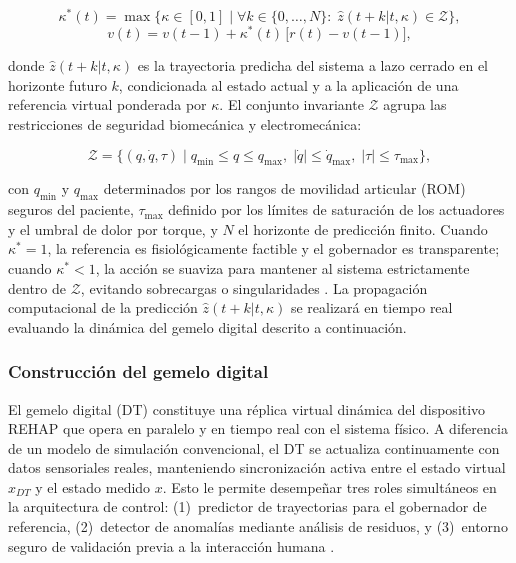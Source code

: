 \documentclass[a4paper,12pt]{article}
\begin{document}
\begin{equation}
    \kappa^{*}(t) = \max\bigl\{\kappa \in [0,1] \;\big|\; \forall k\in\{0,\ldots,N\}:\; \hat{z}(t+k|t, \kappa)\in\mathcal{Z}\bigr\},
    \label{eq:governor}
\end{equation}
\begin{equation}
    v(t) = v(t-1) + \kappa^{*}(t)\,\bigl[r(t) - v(t-1)\bigr],
    \label{eq:governor2}
\end{equation}

\noindent donde $\hat{z}(t+k|t, \kappa)$ es la trayectoria predicha del sistema a lazo cerrado en el horizonte futuro $k$, condicionada al estado actual y a la aplicación de una referencia virtual ponderada por $\kappa$. El conjunto invariante $\mathcal{Z}$ agrupa las restricciones de seguridad biomecánica y electromecánica:

\begin{equation}
    \mathcal{Z} = \bigl\{(q,\dot{q},\tau) \;\big|\; q_{\min}\leq q \leq q_{\max},\; |\dot{q}|\leq \dot{q}_{\max},\; |\tau|\leq \tau_{\max}\bigr\},
    \label{eq:Zset}
\end{equation}

\noindent con $q_{\min}$ y $q_{\max}$ determinados por los rangos de movilidad articular (ROM) seguros del paciente, $\tau_{\max}$ definido por los límites de saturación de los actuadores y el umbral de dolor por torque, y $N$ el horizonte de predicción finito. Cuando $\kappa^{*}=1$, la referencia es fisiológicamente factible y el gobernador es transparente; cuando $\kappa^{*}<1$, la acción se suaviza para mantener al sistema estrictamente dentro de $\mathcal{Z}$, evitando sobrecargas o singularidades \citep{garone2017reference}. La propagación computacional de la predicción $\hat{z}(t+k|t, \kappa)$ se realizará en tiempo real evaluando la dinámica del gemelo digital descrito a continuación.

\subsubsection{Construcción del gemelo digital}
\label{sec:gemelo_digital}

El gemelo digital (DT) constituye una réplica virtual dinámica del dispositivo REHAP que opera en paralelo y en tiempo real con el sistema físico. A diferencia de un modelo de simulación convencional, el DT se actualiza continuamente con datos sensoriales reales, manteniendo sincronización activa entre el estado virtual $\hat{x}_{DT}$ y el estado medido $x$. Esto le permite desempeñar tres roles simultáneos en la arquitectura de control: (1)~predictor de trayectorias para el gobernador de referencia, (2)~detector de anomalías mediante análisis de residuos, y (3)~entorno seguro de validación previa a la interacción humana \citep{gil_model-based_2025, mazumder_next_2023}.
\end{document}
